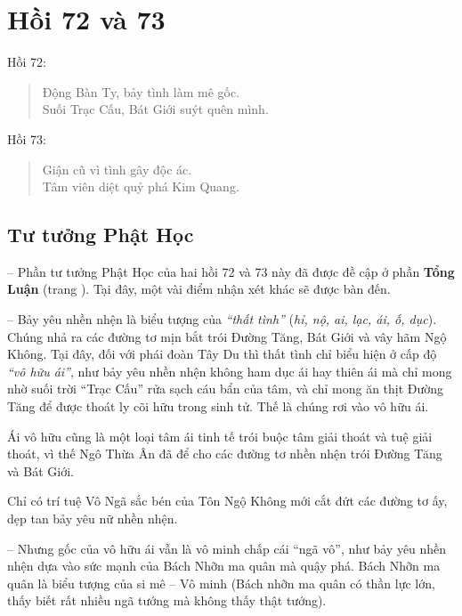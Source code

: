 \chapter{Hồi 72 và 73} %
\label{cha:hoi_72_73}

Hồi 72:

\begin{verse}
\begin{itshape}
Động Bàn Ty, bảy tình làm mê gốc.\\
Suối Trạc Cấu, Bát Giới suýt quên mình.
\end{itshape}
\end{verse}

Hồi 73:

\begin{verse}
\begin{itshape}
Giận cũ vì tình gây độc ác.\\
Tâm viên diệt quỷ phá Kim Quang.
\end{itshape}
\end{verse}

\section{Tư tưởng Phật Học} %
\label{sec:72_73_phat_hoc}

-- Phần tư tưởng Phật Học của hai hồi 72 và 73 này đã được đề cập ở phần {\bf Tổng Luận} (trang \pageref{sec:bieu_tuong_hoi_54_64_va_72}). Tại đây, một vài điểm nhận xét khác sẽ được bàn đến.

-- Bảy yêu nhền nhện là biểu tượng của \emph{``thất tình''} (\emph{hỉ, nộ, ai, lạc, ái, ố, dục}). Chúng nhả ra các đường tơ mịn bắt trói Đường Tăng, Bát Giới và vây hãm Ngộ Không. Tại đây, đối với phái đoàn Tây Du thì thất tình chỉ biểu hiện ở cấp độ \emph{``vô hữu ái''}, như bảy yêu nhền nhện không ham dục ái hay thiên ái mà chỉ mong nhờ suối trời ``Trạc Cấu'' rửa sạch cáu bẩn của tâm, và chỉ mong ăn thịt Đường Tăng để được thoát ly cõi hữu trong sinh tử. Thế là chúng rơi vào vô hữu ái.

Ái vô hữu cũng là một loại tâm ái tinh tế trói buộc tâm giải thoát và tuệ giải thoát, vì thế Ngô Thừa Ân đã để cho các đường tơ nhền nhện trói Đường Tăng và Bát Giới.

Chỉ có trí tuệ Vô Ngã sắc bén của Tôn Ngộ Không mới cắt đứt các đường tơ ấy, dẹp tan bảy yêu nữ nhền nhện.

-- Nhưng gốc của vô hữu ái vẫn là vô minh chấp cái ``ngã vô'', như bảy yêu nhền nhện dựa vào sức mạnh của Bách Nhỡn ma quân mà quậy phá. Bách Nhỡn ma quân là biểu tượng của si mê -- Vô minh (Bách nhỡn ma quân có thần lực lớn, thấy biết rất nhiều ngã tướng mà không thấy thật tướng).

